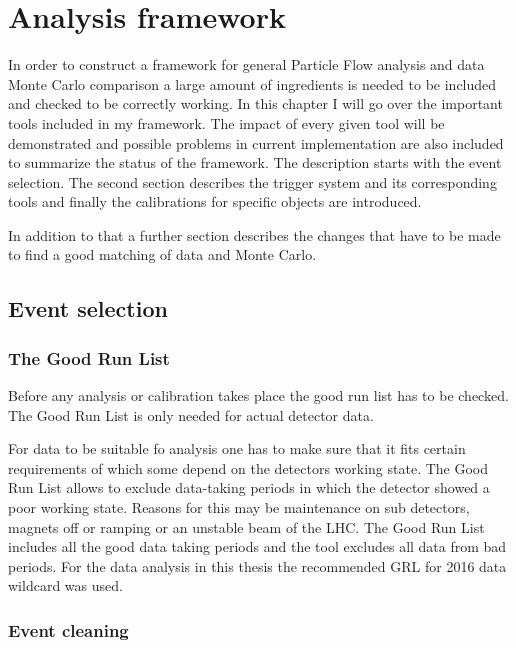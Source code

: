 \chapter{Analysis framework}

In order to construct a framework for general Particle Flow analysis and data Monte Carlo comparison a large amount of ingredients is needed to be included and checked to be correctly working. In this chapter I will go over the important tools included in my framework. The impact of every given tool will be demonstrated and possible problems in current implementation are also included to summarize the status of the framework.
The description starts with the event selection. The second section describes the trigger system and its corresponding tools and finally the calibrations for specific objects are introduced.

In addition to that a further section describes the changes that have to be made to find a good matching of data and Monte Carlo.




\section{Event selection}

\subsection{The Good Run List}

Before any analysis or calibration takes place the good run list has to be checked. The Good Run List is only needed for actual detector data.

For data to be suitable fo analysis one has to make sure that it fits certain requirements of which some depend on the detectors working state. The Good Run List allows to exclude data-taking periods in which the detector showed a poor working state. Reasons for this may be maintenance on sub detectors, magnets off or ramping or an unstable beam of the LHC.
The Good Run List includes all the good data taking periods and the tool excludes all data from bad periods.
For the data analysis in this thesis the recommended GRL for 2016 data wildcard was used.


\subsection{Event cleaning}

